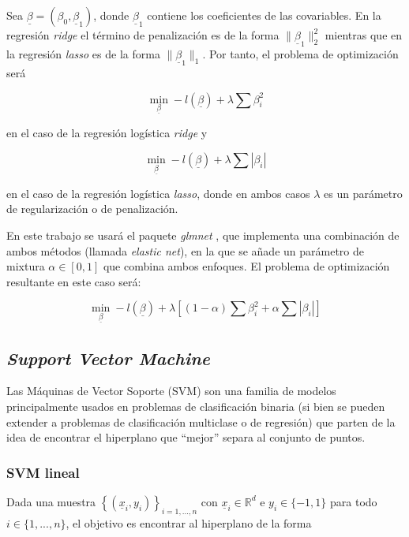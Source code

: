 \documentclass[12pt,a4paper,]{book}
\numberwithin{dummy}{section}
\theoremstyle{ocrenumbox}
\theoremstyle{blacknumex}
\theoremstyle{blacknumbox}
\theoremstyle{ocrenum}
\theoremstyle{ocrenum}
\begin{document}
Sea \(\underline \beta = \left( \beta_0, \underline \beta_1 \right)\),
donde \(\underline \beta_1\) contiene los coeficientes de las
covariables. En la regresión \emph{ridge} el término de penalización es
de la forma \(\| \underline \beta_1 \|^2_2\) mientras que en la
regresión \emph{lasso} es de la forma \(\| \underline \beta_1 \|_1\).
Por tanto, el problema de optimización será

\[\min_{\underline \beta} -l(\underline \beta)  + \lambda \sum \beta_i^2 \]

en el caso de la regresión logística \emph{ridge} y

\[\min_{\underline \beta} -l(\underline \beta)  + \lambda \sum |\beta_i|\]

en el caso de la regresión logística \emph{lasso}, donde en ambos casos
\(\lambda\) es un parámetro de regularización o de penalización.

En este trabajo se usará el paquete \emph{glmnet} \citep{glmnetpackage},
que implementa una combinación de ambos métodos (llamada \emph{elastic
net}), en la que se añade un parámetro de mixtura
\(\alpha \in \left[0,1\right]\) que combina ambos enfoques. El problema
de optimización resultante en este caso será:

\[\min_{\underline \beta} -l(\underline \beta)  + \lambda \left[(1-\alpha)\sum \beta_i^2 + \alpha \sum |\beta_i| \right]\]

\hypertarget{support-vector-machine}{%
\subsection{\texorpdfstring{\emph{Support Vector
Machine}}{Support Vector Machine}}\label{support-vector-machine}}

Las Máquinas de Vector Soporte (SVM) son una familia de modelos
principalmente usados en problemas de clasificación binaria (si bien se
pueden extender a problemas de clasificación multiclase o de regresión)
que parten de la idea de encontrar el hiperplano que ``mejor'' separa al
conjunto de puntos.

\hypertarget{svm-lineal}{%
\subsubsection{SVM lineal}\label{svm-lineal}}

Dada una muestra \(\left\{(\underline x_i,y_i) \right\}_{i=1,...,n}\)
con \(\underline x_i \in \mathbb{R}^d\) e \(y_i \in \{-1,1\}\) para todo
\(i \in \{1,...,n\}\), el objetivo es encontrar al hiperplano de la
forma
\end{document}
